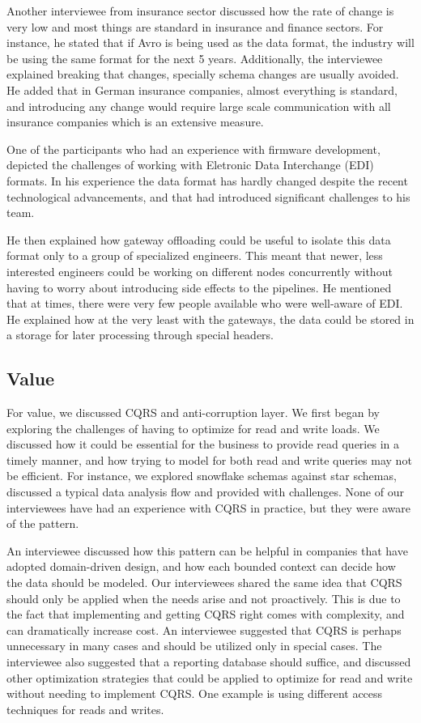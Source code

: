\documentclass{bmcart}
\begin{document}
Another interviewee from insurance sector discussed how the rate of change is very low and most things are standard in insurance and finance sectors. For instance, he stated that if Avro is being used as the data format, the industry will be using the same format for the next 5 years. Additionally, the interviewee explained breaking that changes, specially schema changes are usually avoided. He added that in German insurance companies, almost everything is standard, and introducing any change would require large scale communication with all insurance companies which is an extensive measure. 

One of the participants who had an experience with firmware development, depicted the challenges of working with Eletronic Data Interchange (EDI) formats. In his experience the data format has hardly changed despite the recent technological advancements, and that had introduced significant challenges to his team. 

He then explained how gateway offloading could be useful to isolate this data format only to a group of specialized engineers. This meant that newer, less interested engineers could be working on different nodes concurrently without having to worry about introducing side effects to the pipelines. He mentioned that at times, there were very few people available who were well-aware of EDI. He explained how at the very least with the gateways, the data could be stored in a storage for later processing through special headers. 



\subsection{Value}

For value, we discussed CQRS and anti-corruption layer. We first began by exploring the challenges of having to optimize for read and write loads. We discussed how it could be essential for the business to provide read queries in a timely manner, and how trying to model for both read and write queries may not be efficient. For instance, we explored snowflake schemas against star schemas, discussed a typical data analysis flow and provided with challenges. None of our interviewees have had an experience with CQRS in practice, but they were aware of the pattern. 

An interviewee discussed how this pattern can be helpful in companies that have adopted domain-driven design, and how each bounded context can decide how the data should be modeled. Our interviewees shared the same idea that CQRS should only be applied when the needs arise and not proactively. This is due to the fact that implementing and getting CQRS right comes with complexity, and can dramatically increase cost. An interviewee suggested that CQRS is perhaps unnecessary in many cases and should be utilized only in special cases. The interviewee also suggested that a reporting database should suffice, and discussed other optimization strategies that could be applied to optimize for read and write without needing to implement CQRS. One example is using different access techniques for reads and writes. 
\end{document}
